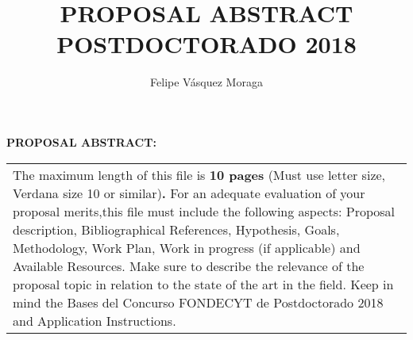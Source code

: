 ﻿\documentclass[10pt]{article}
\author{Felipe Vásquez Moraga}
\title{PROPOSAL ABSTRACT POSTDOCTORADO 2018}
\begin{document}
\noindent \textbf{PROPOSAL ABSTRACT: }

\noindent \textbf{}

{\raggedright

\vspace{3pt} \noindent
\begin{tabular}{|p{514pt}|}
\hline
\parbox{514pt} {\raggedright  \vspace{3pt}
The maximum length of this file is \textbf{10 pages} (Must use letter size, Verdana size 10 or similar)\textbf{. }For an adequate evaluation of your proposal merits,this file must include the following aspects: Proposal description, Bibliographical References, Hypothesis, Goals, Methodology, Work Plan, Work in progress (if applicable) and Available Resources.
Make sure to describe the relevance of the proposal topic in relation to the state of the art in the field.
Keep in mind the Bases del Concurso FONDECYT de Postdoctorado 2018 and Application Instructions.} \\
\hline
\end{tabular}
\vspace{2pt}

}
\end{document}
